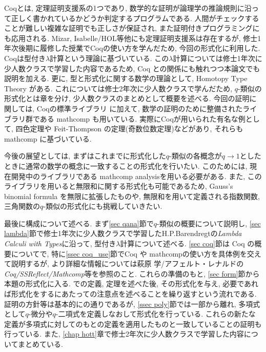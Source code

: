 \documentclass[11pt]{jsreport}
\theoremstyle{mystyle}
\newcommand{\0}{\textbf{0}}
\begin{document}
Coqとは, 定理証明支援系の1つであり, 数学的な証明が論理学の推論規則に沿って正しく書かれているかどうか判定するプログラムである.
人間がチェックすることが難しい複雑な証明でも正しさが保証され, また証明付きプログラミングにも応用される. Mizar, Isabelle/HOL等他にも定理証明支援系は存在するが, 修士1年次後期に履修した授業でCoqの使い方を学んだため, 今回の形式化に利用した. 
Coqは型付き$\lambda$計算という理論に基づいている. この$\lambda$計算については修士1年次に少人数クラスで学習した内容であるため, Coq との関係にも触れつつ本論文でも説明を加える. 更に, 型と形式化に関する数学の理論として, Homotopy Type Theory がある. これについては修士2年次に少人数クラスで学んだため, $q$-類似の形式化とは章を分け, 少人数クラスのまとめとして概要を述べる. 今回の証明に関しては, Coqの標準ライブラリ \cite{coq sl}に加えて, 数学の証明のために整備されたライブラリ群である mathcomp \cite{coq mc}も用いている. 
実際にCoqが用いられた有名な例として, 四色定理や Feit-Thompson の定理(奇数位数定理)などがあり, それらも mathcomp に基づいている. 

今後の展望としては, まずはこれまでに形式化した$q$-類似の各概念が$q \to 1$としたときに通常の数学の概念に一致することの形式化を行いたい. このためには, 現在開発中のライブラリである mathcomp analysis\cite{coq ana}を用いる必要がある. また, このライブラリを用いると無限和に関する形式化も可能であるため, Gauss's binomial formula を無限に拡張したものや, 無限和を用いて定義される指数関数, 三角関数の$q$-類似の形式化にも挑戦していきたい. 

最後に構成について述べる. 
まず\ref{sec qana}節で$q$-類似の概要について説明し, 
\ref{sec lambda}節で修士1年次に少人数クラスで学習したH.P.Barendregtの{\it Lambda Calculi with Types}\cite{Bar}に沿って, 型付き$\lambda$計算について述べる. 
\ref{sec coq}節は Coq の概要についてで, 特に\ref{ssec coq_use}節でCoq や mathcompの使い方を具体例を交えて説明するが, より詳細な情報については萩原 学/アフェルト・レナルドの{\it Coq/SSReflect/Mathcomp}\cite{Hag}等を参照のこと. 
これらの準備のもと, \ref{sec form}節から本題の形式化に入る. \cite{Kac}での定義, 定理を述べた後, その形式化を与え, 必要であれば形式化をするにあたっての注意点を述べることを繰り返すという流れである. 
証明の方針等は基本的に\cite{Kac}の通りであるが, \ref{ssec poly}節では一部\cite{Kac}から離れ, 多項式として$q$-微分や$q$-二項式を定義しなおして形式化を行っている. これらの新たな定義が多項式に対してのもとの定義を適用したものと一致していることの証明も行っている. また, \ref{chap hott}章で修士2年次に少人数クラスで学習した内容についてまとめている. 
\end{document}
